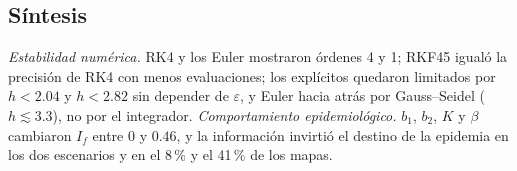 \subsection{Síntesis}
\emph{Estabilidad numérica.} RK4 y los Euler mostraron órdenes 4 y 1; RKF45 igualó la precisión de RK4 con menos evaluaciones; los explícitos quedaron limitados por $h<2.04$ y $h<2.82$ sin depender de $\varepsilon$, y Euler hacia atrás por Gauss--Seidel ($h\lesssim3.3$), no por el integrador. \emph{Comportamiento epidemiológico.} $b_1$, $b_2$, $K$ y $\beta$ cambiaron $I_f$ entre $0$ y $0.46$, y la información invirtió el destino de la epidemia en los dos escenarios y en el 8\,\% y el 41\,\% de los mapas.
